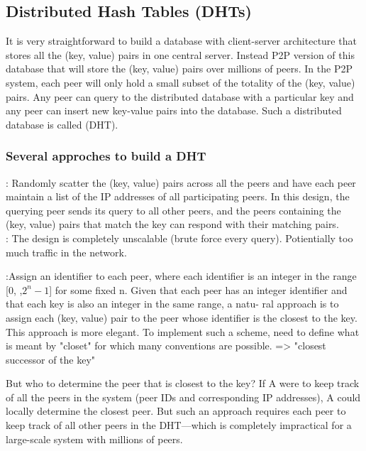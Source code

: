 \subsection{Distributed Hash Tables (DHTs)}

\hf It is very straightforward to build a database with client-server architecture that
stores all the (key, value) pairs in one central server. Instead P2P version of this database
that will store the (key, value) pairs over millions of peers. In the P2P system, each peer will only hold a
small subset of the totality of the (key, value) pairs. Any peer can query to the distributed
database with a particular key and any peer can insert new key-value pairs into the 
database. Such a distributed database is called (DHT).\\

\subsubsection{Several approches to build a DHT}


   \hf {}: Randomly scatter the (key,
    value) pairs across all the peers and have each peer maintain a list of the IP
    addresses of all participating peers. In this design, the querying peer sends its query
    to all other peers, and the peers containing the (key, value) pairs that match the key
    can respond with their matching pairs.\\
    : The design is completely unscalable (brute force every query). Potientially too much traffic in the network.\\
    \newline

    :Assign an identifier to each peer, where each identifier is an integer in the range [0,
    ,$2^n - 1$] for some fixed n. Given that each peer
    has an integer identifier and that each key is also an integer in the same range, a natu-
    ral approach is to assign each (key, value) pair to the peer whose identifier is the
    closest to the key.\\
    This approach is more elegant. To implement such a scheme, need to define what is meant by "closet"
    for which many conventions are possible. => "closest successor of the key"\\
    \newline


    But who to determine the peer that is closest to the key? If A were to keep track of all the peers in the system (peer IDs and corresponding
    IP addresses), A could locally determine the closest peer. But such an approach
    requires each peer to keep track of all other peers in the DHT—which is completely
    impractical for a large-scale system with millions of peers.


